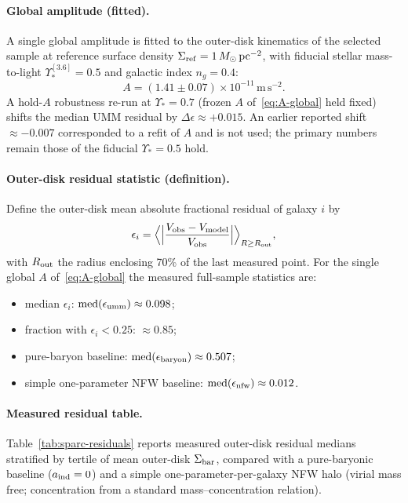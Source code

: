 \documentclass[11pt,a4paper]{article}
\begin{document}
\paragraph{Global amplitude (fitted).}
A single global amplitude is fitted to the outer-disk kinematics of the selected sample at reference surface density \(\Sigma_{\rm ref}=1\,M_\odot\,\mathrm{pc^{-2}}\), with fiducial stellar mass-to-light \(\Upsilon_*^{[3.6]}=0.5\) and galactic index \(n_g=0.4\):
\begin{equation}
A=(1.41\pm 0.07)\times 10^{-11}\,\mathrm{m\,s^{-2}}.
\label{eq:A-global}
\end{equation}
A hold-\(A\) robustness re-run at \(\Upsilon_*=0.7\) (frozen \(A\) of~\eqref{eq:A-global} held fixed) shifts the median UMM residual by \(\Delta\epsilon\approx +0.015\). An earlier reported shift \(\approx -0.007\) corresponded to a refit of \(A\) and is not used; the primary numbers remain those of the fiducial \(\Upsilon_*=0.5\) hold.

\paragraph{Outer-disk residual statistic (definition).}
Define the outer-disk mean absolute fractional residual of galaxy \(i\) by
\begin{equation}
\epsilon_i
=\Bigl\langle
\Bigl|\frac{V_{\rm obs}-V_{\rm model}}{V_{\rm obs}}\Bigr|
\Bigr\rangle_{R\geq R_{\rm out}},
\label{eq:epsilon}
\end{equation}
with \(R_{\rm out}\) the radius enclosing 70\% of the last measured point. For the single global \(A\) of~\eqref{eq:A-global} the measured full-sample statistics are:
\begin{itemize}[leftmargin=*]
\item median \(\epsilon_i\): \(\mathrm{med}(\epsilon_{\rm umm})\approx 0.098\);
\item fraction with \(\epsilon_i<0.25\): \(\approx 0.85\);
\item pure-baryon baseline: \(\mathrm{med}(\epsilon_{\rm baryon})\approx 0.507\);
\item simple one-parameter NFW baseline: \(\mathrm{med}(\epsilon_{\rm nfw})\approx 0.012\).
\end{itemize}

\paragraph{Measured residual table.}
Table~\ref{tab:sparc-residuals} reports measured outer-disk residual medians stratified by tertile of mean outer-disk \(\Sigma_{\rm bar}\), compared with a pure-baryonic baseline (\(a_{\rm ind}=0\)) and a simple one-parameter-per-galaxy NFW halo (virial mass free; concentration from a standard mass--concentration relation).
\end{document}
